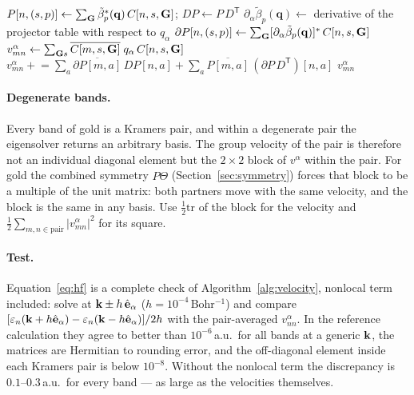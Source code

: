 \begin{algorithm}[H]
\caption{Velocity matrix elements at one $\kk$-point}
\label{alg:velocity}
\begin{algorithmic}[1]
\State $P[n,(s,p)] \gets \sum_{\mathbf{G}} \tilde\beta_p^*(\mathbf q)\,C[n,s,\mathbf{G}]$;\quad
$DP \gets P\,D^{\mathsf T}$ 
\State $\partial_\alpha\tilde\beta_p(\mathbf q) \gets$ derivative of the
projector table with respect to $q_\alpha$
\State $\partial P[n,(s,p)] \gets \sum_{\mathbf{G}}
[\partial_\alpha\tilde\beta_p(\mathbf q)]^*\,C[n,s,\mathbf{G}]$
\State $v^\alpha_{mn} \gets \sum_{\mathbf{G} s}\overline{C[m,s,\mathbf{G}]}\; q_\alpha\, C[n,s,\mathbf{G}]$
\State $v^\alpha_{mn} \mathrel{+}= \sum_{a}\overline{\partial P[m,a]}\,DP[n,a]
+ \sum_{a}\overline{P[m,a]}\,(\partial P\,D^{\mathsf T})[n,a]$
\EndFor
\State \Return $v^\alpha_{mn}$ 
\EndFunction
\end{algorithmic}
\end{algorithm}

\paragraph{Degenerate bands.} Every band of gold is a Kramers pair, and
within a degenerate pair the eigensolver returns an arbitrary basis. The
group velocity of the pair is therefore not an individual diagonal element
but the $2\times2$ block of $v^\alpha$ within the pair. For gold the
combined symmetry $\hat P\Theta$ (Section~\ref{sec:symmetry}) forces that
block to be a multiple of the unit matrix: both partners move with the
same velocity, and the block is the same in any basis. Use
$\tfrac12\mathrm{tr}$ of the block for the velocity and
$\tfrac12\sum_{m,n\in\text{pair}}|v^\alpha_{mn}|^2$ for its square.

\paragraph{Test.} Equation~\eqref{eq:hf} is a complete check of
Algorithm~\ref{alg:velocity}, nonlocal term included: solve at
$\mathbf{k} \pm h\,\hat{\mathbf e}_\alpha$ ($h = 10^{-4}$\,Bohr$^{-1}$) and compare
$[\varepsilon_n(\mathbf{k}+h\hat{\mathbf e}_\alpha) -
\varepsilon_n(\mathbf{k}-h\hat{\mathbf e}_\alpha)]/2h$ with the pair-averaged
$v^\alpha_{nn}$. In the reference calculation they agree to better
than $10^{-6}$\,a.u.\ for all bands at a generic $\kk$, the matrices are
Hermitian to rounding error, and the off-diagonal element inside each
Kramers pair is below $10^{-8}$. Without the nonlocal term the
discrepancy is $0.1$--$0.3$\,a.u.\ for every band --- as large as the
velocities themselves.


